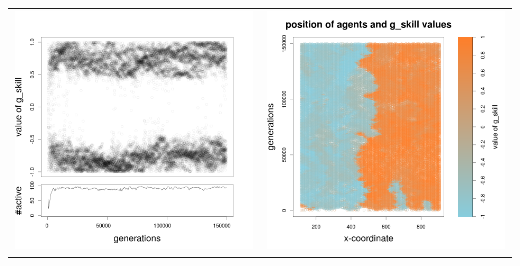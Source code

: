 \documentclass[a4paper,10pt]{article}
\begin{document}
\begin{table}[H]
\begin{tabular}{cc}
\newline
\includegraphics[width=\imgSize]{../images/5StaticEnv/Gplot66_staticEnv1}&\includegraphics[width=\imgSize]{../images/5StaticEnv/Gplot66Static_staticEnv1}\\
\end{tabular}
\end{table}
\end{document}
